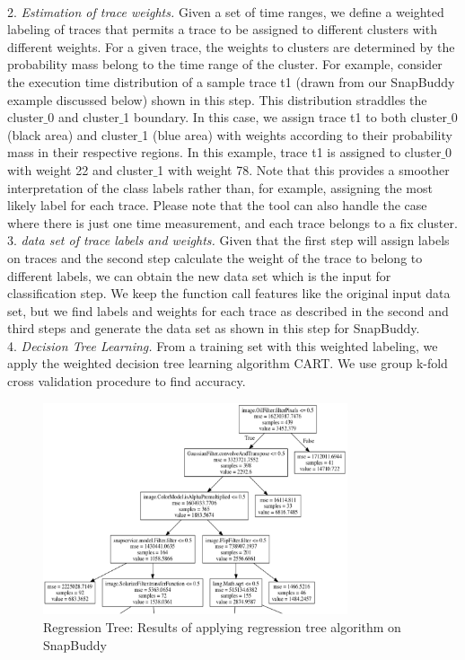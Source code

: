 \documentclass{article}
\begin{document}
\\2. \smallskip\textit{Estimation of trace weights.}
Given a set of time ranges, we define a weighted labeling of traces
that permits a trace to be assigned to different clusters with different weights.
For a given trace, the weights to clusters are determined by the
probability mass belong to the time range of the cluster.  For
example, consider the execution time distribution of a sample trace t1
(drawn from our SnapBuddy example discussed below) shown in
this step. This distribution straddles the
cluster$\_$0 and cluster$\_$1 boundary.  In this case, we assign trace
t1 to both cluster$\_$0 (black area) and cluster$\_$1 (blue area) with
weights according to their probability mass in their respective
regions. In this example, trace t1 is assigned
to cluster$\_$0 with weight 22 and cluster$\_$1 with weight 78. Note
that this provides a smoother interpretation of the class labels
rather than, for example, assigning the most likely label for each
trace. Please note that the tool can also handle the case where
there is just one time measurement, and each trace belongs to a
fix cluster. \\
3. \smallskip\textit{data set of trace labels and weights.}
Given that the first step will assign labels on traces and the second step
calculate the weight of the trace to belong to different labels,
we can obtain the new data set which is the input for classification step. 
We keep the function call features like the original input data set, but we
find labels and weights for each trace as described in the second and third steps
and generate the data set as shown in this step for SnapBuddy. \\
4. \smallskip\textit{Decision Tree Learning.}
From a training set with this weighted labeling, we apply the weighted
decision tree learning algorithm CART. We use group k-fold cross
validation procedure to find accuracy. 
\begin{figure}[t]
    \centering
    \includegraphics[width=0.8\textwidth]{Regression_Tree}
    \caption{Regression Tree: Results of applying regression tree algorithm on SnapBuddy}
    \label{Regression_Tree}
\end{figure}
\end{document}

